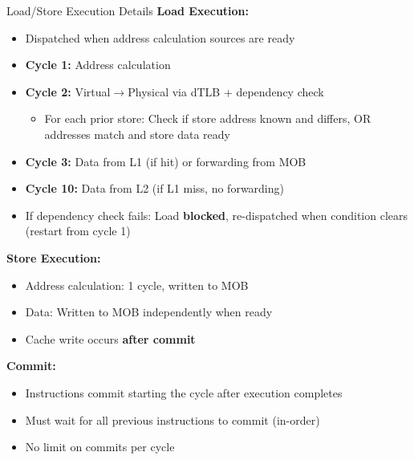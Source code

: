 \documentclass[aspectratio=169,12pt]{beamer}
\begin{document}
\begin{frame}{Load/Store Execution Details}
\textbf{Load Execution:}
\begin{itemize}
    \item Dispatched when address calculation sources are ready
    \item \textbf{Cycle 1:} Address calculation
    \item \textbf{Cycle 2:} Virtual$\rightarrow$Physical via dTLB + dependency check
    \begin{itemize}
        \item For each prior store: Check if store address known and differs, OR addresses match and store data ready
    \end{itemize}
    \item \textbf{Cycle 3:} Data from L1 (if hit) or forwarding from MOB
    \item \textbf{Cycle 10:} Data from L2 (if L1 miss, no forwarding)
    \item If dependency check fails: Load \textbf{blocked}, re-dispatched when condition clears (restart from cycle 1)
\end{itemize}

\textbf{Store Execution:}
\begin{itemize}
    \item Address calculation: 1 cycle, written to MOB
    \item Data: Written to MOB independently when ready
    \item Cache write occurs \textbf{after commit}
\end{itemize}

\textbf{Commit:}
\begin{itemize}
    \item Instructions commit starting the cycle after execution completes
    \item Must wait for all previous instructions to commit (in-order)
    \item No limit on commits per cycle
\end{itemize}
\end{frame}
\end{document}
